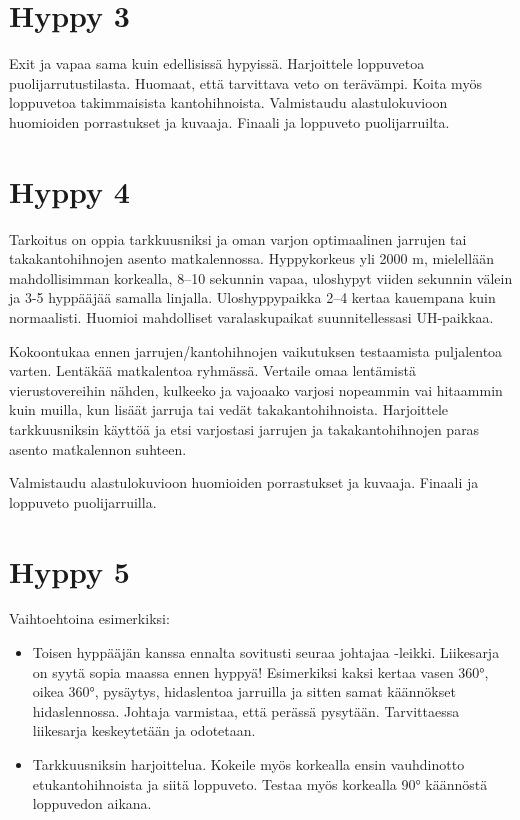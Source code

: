 \section{ Hyppy 3 }
\label{kuvunkasittelyharjoitukset-hyppy-3}


Exit ja vapaa sama kuin edellisissä hypyissä. Harjoittele loppuvetoa puolijarrutustilasta. Huomaat, että tarvittava veto on terävämpi. Koita myös loppuvetoa takimmaisista kantohihnoista. Valmistaudu alastulokuvioon huomioiden porrastukset ja kuvaaja. Finaali ja loppuveto puolijarruilta. 

\section{ Hyppy 4 }
\label{kuvunkasittelyharjoitukset-hyppy-4}


Tarkoitus on oppia tarkkuusniksi ja oman varjon optimaalinen jarrujen tai takakantohihnojen asento matkalennossa. Hyppykorkeus yli 2000 m, mielellään mahdollisimman korkealla, 8–10 sekunnin vapaa, uloshypyt viiden sekunnin välein ja 3-5 hyppääjää samalla linjalla. Uloshyppypaikka 2–4 kertaa kauempana kuin normaalisti. Huomioi mahdolliset varalaskupaikat suunnitellessasi UH-paikkaa. 


Kokoontukaa ennen jarrujen/kantohihnojen vaikutuksen testaamista puljalentoa varten. Lentäkää matkalentoa ryhmässä. Vertaile omaa lentämistä vierustovereihin nähden, kulkeeko ja vajoaako varjosi nopeammin vai hitaammin kuin muilla, kun lisäät jarruja tai vedät takakantohihnoista. Harjoittele tarkkuusniksin käyttöä ja etsi varjostasi jarrujen ja takakantohihnojen paras asento matkalennon suhteen. 


Valmistaudu alastulokuvioon huomioiden porrastukset ja kuvaaja. Finaali ja loppuveto puolijarruilla. 

\section{ Hyppy 5 }
\label{kuvunkasittelyharjoitukset-hyppy-5}


Vaihtoehtoina esimerkiksi:  

\begin{itemize}
\item  Toisen hyppääjän kanssa ennalta sovitusti seuraa johtajaa -leikki. Liikesarja on syytä sopia maassa ennen hyppyä! Esimerkiksi kaksi kertaa vasen 360°, oikea 360°, pysäytys, hidaslentoa jarruilla ja sitten samat käännökset hidaslennossa. Johtaja varmistaa, että perässä pysytään. Tarvittaessa liikesarja keskeytetään ja odotetaan.  
\item  Tarkkuusniksin harjoittelua. Kokeile myös korkealla ensin vauhdinotto etukantohihnoista ja siitä loppuveto. Testaa myös korkealla 90° käännöstä loppuvedon aikana. 
\end{itemize}
